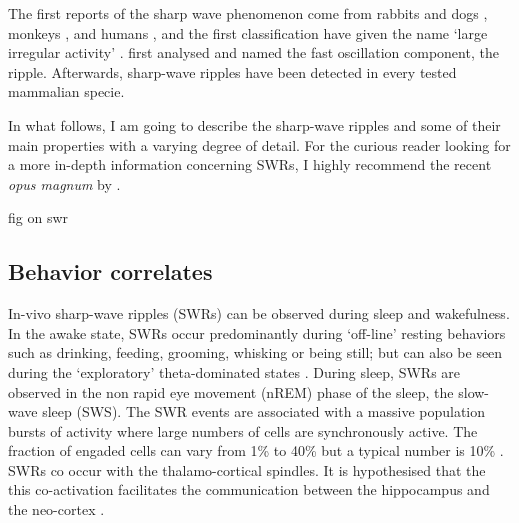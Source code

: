   The first reports of the sharp wave phenomenon come from rabbits
  \citep{Stumpf1965} and dogs \citep{Yoshii1966}, monkeys \citep{Freemon1969}, and
  humans \cite{Freemon1970}, and the first classification have given the name
  `large irregular activity' \citep{Vanderwolf1969}. \cite{Buzsaki1992} first
  analysed and named the fast oscillation component, the ripple. Afterwards,
  sharp-wave ripples have been detected in every tested mammalian specie. 

  In what follows, I am going to describe the sharp-wave ripples and some of
  their main properties with a varying degree of detail. For the curious reader
  looking for a more in-depth information concerning SWRs, I highly recommend
  the recent \textit{opus magnum} by \citep{Buzsaki2015}.

  fig on swr

  \subsection{Behavior correlates}

    In-vivo sharp-wave ripples (SWRs) can be observed during sleep and
    wakefulness. In the awake state, SWRs occur predominantly during `off-line'
    resting behaviors such as drinking, feeding, grooming, whisking or being
    still; but can also be seen during the `exploratory' theta-dominated states
    \citep{Oneill2006}. During sleep, SWRs are observed in the non rapid eye
    movement (nREM) phase of the sleep, the slow-wave sleep (SWS). The SWR
    events are associated with a massive population bursts of activity where
    large numbers of cells are synchronously active. The fraction of engaded
    cells can vary from 1\% to 40\% but a typical number is 10\%
    \citep{Mizuseki2013}. SWRs co occur with the thalamo-cortical spindles. It
    is hypothesised that the this co-activation facilitates the communication
    between the hippocampus and the neo-cortex \citep{Sirota2003}.
    
